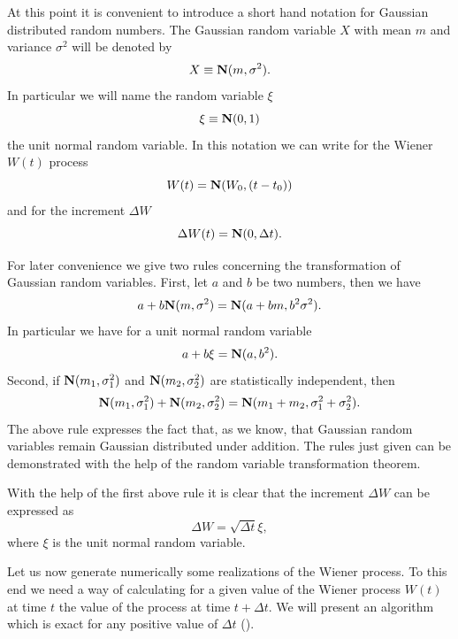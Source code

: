 At this point it is convenient to introduce a short hand notation 
for Gaussian distributed random numbers. The Gaussian random 
variable $X$ with mean $m$ and variance $\sigma^2$ will be denoted
by
\begin{equation*}
X \equiv {\bf N}(m,\sigma^2).
\end{equation*}
In particular we will name the random variable $\xi$
\begin{equation*}
\xi \equiv {\bf N}(0,1)
\end{equation*}
the unit normal random variable. In this notation we can write
for the Wiener $W(t)$ process
\begin{equation*}
W(t) = {\bf N} ( W_0, (t-t_0) )
\end{equation*}
and for the increment $\Delta W$
\begin{equation*}
\Delta W(t) = {\bf N} (0, 
     \Delta t ).
\end{equation*}

For later convenience we give two rules concerning the 
transformation of Gaussian random variables. First, let $a$ and $b$
be two numbers, then we have
\begin{equation*}
a +b {\bf N}(m,\sigma^2) = {\bf N} ( a+bm, b^2\sigma^2).
\end{equation*}
In particular we have for a unit normal random variable
\begin{equation*}
a+b\xi = {\bf N}(a,b^2).
\end{equation*}
Second, if ${\bf N}(m_1,\sigma_1^2)$ and ${\bf N}(m_2,\sigma_2^2)$ 
are statistically independent, then
\begin{equation*}
{\bf N}(m_1,\sigma_1^2) + {\bf N}(m_2,\sigma_2^2) =
   {\bf N}(m_1+m_2,\sigma_1^2+\sigma_2^2).
\end{equation*}
The above rule expresses the fact that, as we know, that Gaussian 
random variables remain Gaussian distributed under addition.
The rules just given can be demonstrated with the help of the 
random variable transformation theorem.

With the help of the first above rule it is clear that the 
increment $\Delta W$ can be expressed as
\begin{equation*}
\Delta W = \sqrt{\Delta t} \xi,
\end{equation*}
where $\xi$ is the unit normal random variable.

Let us now generate numerically some realizations of the Wiener 
process. To this end we need a way of calculating for a given 
value of the Wiener process $W(t)$ at time $t$ the value of the
process at time $t+\Delta t$. We will present an algorithm which
is exact for any positive value of $\Delta t$ (\cite{GILLESPIE}).

